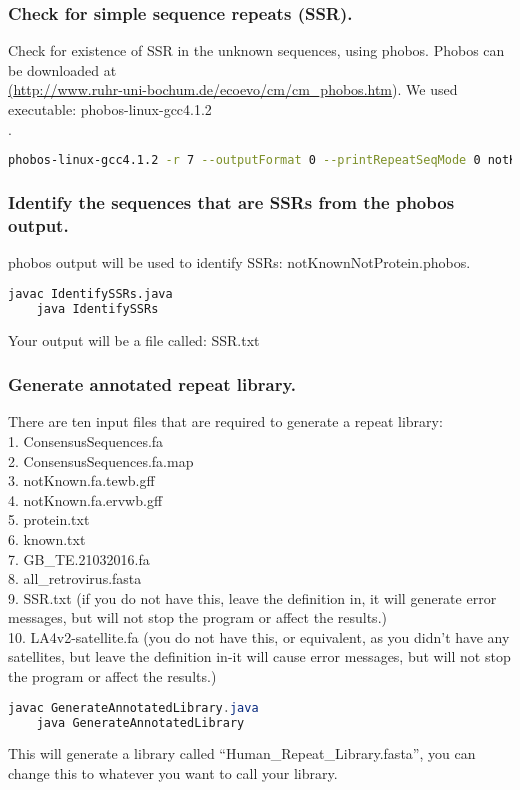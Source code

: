 \documentclass[a4paper,12pt]{article}
\begin{document}
	\subsubsection{Check for simple sequence repeats (SSR).}
	Check for existence of SSR in the unknown sequences, using phobos. Phobos can be downloaded at \\ \href{<url>}(\url{http://www.ruhr-uni-bochum.de/ecoevo/cm/cm_phobos.htm}). We used executable: phobos-linux-gcc4.1.2\\
	.
	\begin{lstlisting}[language=bash]
	phobos-linux-gcc4.1.2 -r 7 --outputFormat 0 --printRepeatSeqMode 0 notKnownNotProtein.fa > notKnownNotProtein.phobos \end{lstlisting}
	
	\subsubsection{Identify the sequences that are SSRs from the phobos output.}
	phobos output will be used to identify SSRs: notKnownNotProtein.phobos.
	\begin{lstlisting}[language=bash]
	javac IdentifySSRs.java
	java IdentifySSRs \end{lstlisting}
	Your output will be a file called: SSR.txt
	
	\subsubsection{Generate annotated repeat library.}
	There are ten input files that are required to generate a repeat library: \\
	1. ConsensusSequences.fa \\
	2. ConsensusSequences.fa.map \\
	3. notKnown.fa.tewb.gff \\
	4. notKnown.fa.ervwb.gff \\
	5. protein.txt \\
	6. known.txt \\
	7. GB\_TE.21032016.fa \\
	8. all\_retrovirus.fasta \\
	9. SSR.txt (if you do not have this, leave the definition in, it will generate error messages, but will not stop the program or affect the results.) \\
	10. LA4v2-satellite.fa (you do not have this, or equivalent, as you didn't have any satellites, but leave the definition in-it will cause error messages, but will not stop the program or affect the results.)
	\begin{lstlisting}[language=java]
	javac GenerateAnnotatedLibrary.java
	java GenerateAnnotatedLibrary \end{lstlisting}
	This will generate a library called \textquotedblleft Human\_Repeat\_Library.fasta\textquotedblright, you can change this to whatever you want to call your library.
	
\end{document}
